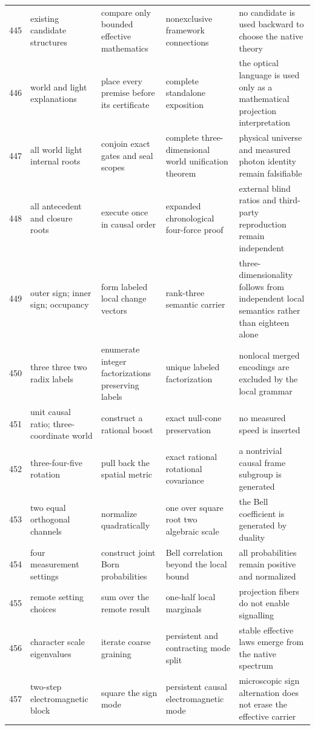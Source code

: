 \documentclass[11pt]{article}
\numberwithin{equation}{section}
\theoremstyle{remark}
\begin{document}
\begin{landscape}
\begin{longtable}{p{0.65cm}p{3.5cm}p{4.0cm}p{4.0cm}p{4.6cm}}
445&existing candidate structures&compare only bounded effective mathematics&nonexclusive framework connections&no candidate is used backward to choose the native theory\\
446&world and light explanations&place every premise before its certificate&complete standalone exposition&the optical language is used only as a mathematical projection interpretation\\
447&all world light internal roots&conjoin exact gates and seal scopes&complete three-dimensional world unification theorem&physical universe and measured photon identity remain falsifiable\\
448&all antecedent and closure roots&execute once in causal order&expanded chronological four-force proof&external blind ratios and third-party reproduction remain independent\\
449&outer sign; inner sign; occupancy&form labeled local change vectors&rank-three semantic carrier&three-dimensionality follows from independent local semantics rather than eighteen alone\\
450&three three two radix labels&enumerate integer factorizations preserving labels&unique labeled factorization&nonlocal merged encodings are excluded by the local grammar\\
451&unit causal ratio; three-coordinate world&construct a rational boost&exact null-cone preservation&no measured speed is inserted\\
452&three-four-five rotation&pull back the spatial metric&exact rational rotational covariance&a nontrivial causal frame subgroup is generated\\
453&two equal orthogonal channels&normalize quadratically&one over square root two algebraic scale&the Bell coefficient is generated by duality\\
454&four measurement settings&construct joint Born probabilities&Bell correlation beyond the local bound&all probabilities remain positive and normalized\\
455&remote setting choices&sum over the remote result&one-half local marginals&projection fibers do not enable signalling\\
456&character scale eigenvalues&iterate coarse graining&persistent and contracting mode split&stable effective laws emerge from the native spectrum\\
457&two-step electromagnetic block&square the sign mode&persistent causal electromagnetic mode&microscopic sign alternation does not erase the effective carrier\\

\end{longtable}
\end{landscape}
\end{document}

